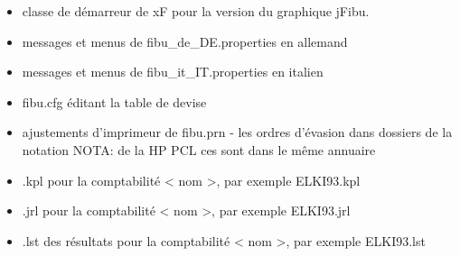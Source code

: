 \documentclass[12pt]{report}
\begin{document}
\begin{itemize}
\item classe de démarreur de xF pour la version du graphique jFibu.



\item messages et menus de fibu\_de\_DE.properties en allemand



\item messages et menus de fibu\_it\_IT.properties en italien



\item fibu.cfg éditant la table de devise



\item ajustements d'imprimeur de fibu.prn - les ordres d'évasion dans dossiers de la notation NOTA: de la HP PCL ces sont dans le même annuaire



\item  <plan des comptes de Name>.kpl pour la comptabilité < nom >, par exemple ELKI93.kpl



\item < journal de Name>.jrl pour la comptabilité < nom >, par exemple ELKI93.jrl



\item < Name>.lst des résultats pour la comptabilité < nom >, par exemple ELKI93.lst 



\end{itemize}
\end{document}
